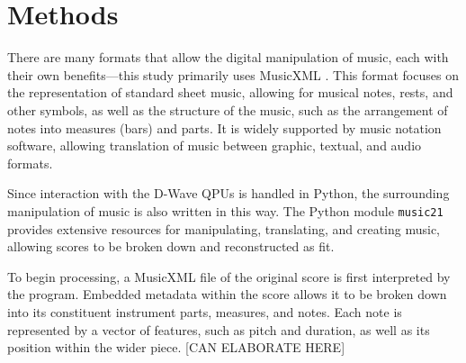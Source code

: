 \documentclass[aps,pra,10pt,twocolumn]{revtex4-2}
\begin{document}







\newpage
\section{Methods}

There are many formats that allow the digital manipulation of music, each with their own benefits—this study primarily uses MusicXML \cite{musicxml}. This format focuses on the representation of standard sheet music, allowing for musical notes, rests, and other symbols, as well as the structure of the music, such as the arrangement of notes into measures (bars) and parts. It is widely supported by music notation software, allowing translation of music between graphic, textual, and audio formats.

Since interaction with the D-Wave QPUs is handled in Python, the surrounding manipulation of music is also written in this way. The Python module \verb|music21| provides extensive resources for manipulating, translating, and creating music, allowing scores to be broken down and reconstructed as fit.

To begin processing, a MusicXML file of the original score is first interpreted by the program. Embedded metadata within the score allows it to be broken down into its constituent instrument parts, measures, and notes. Each note is represented by a vector of features, such as pitch and duration, as well as its position within the wider piece. [CAN ELABORATE HERE]
\end{document}
